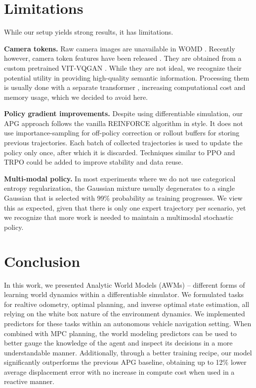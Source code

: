 \section{Limitations}

While our setup yields strong results, it has limitations. 

\textbf{Camera tokens.} Raw camera images are unavailable in WOMD \cite{ettinger2021large}. Recently however, camera token features have been released \cite{mu2024most}. They are obtained from a custom pretrained VIT-VQGAN \cite{yu2021vector}. While they are not ideal, we recognize their potential utility in providing high-quality semantic information. Processing them is usually done with a separate transformer \cite{dosovitskiy2020image, vaswani2017attention}, increasing computational cost and memory usage, which we decided to avoid here. 

\textbf{Policy gradient improvements.} Despite using differentiable simulation, our APG approach follows the vanilla REINFORCE algorithm in style. It does not use importance-sampling for off-policy correction or rollout buffers for storing previous trajectories. Each batch of collected trajectories is used to update the policy only once, after which it is discarded. Techniques similar to PPO \cite{schulman2017proximal} and TRPO \cite{schulman2015trust} could be added to improve stability and data reuse.

\textbf{Multi-modal policy.} In most experiments where we do not use categorical entropy regularization, the Gaussian mixture usually degenerates to a single Gaussian that is selected with 99\% probability as training progresses. We view this as expected, given that there is only one expert trajectory per scenario, yet we recognize that more work is needed to maintain a multimodal stochastic policy.


\section{Conclusion}
\label{sec: conclusion}

In this work, we presented Analytic World Models (AWMs) -- different forms of learning world dynamics within a differentiable simulator. We formulated tasks for realtive odometry, optimal planning, and inverse optimal state estimation, all relying on the white box nature of the environment dynamics. We implemented predictors for these tasks within an autonomous vehicle navigation setting. When combined with MPC planning, the world modeling predictors can be used to better gauge the knowledge of the agent and inspect its decisions in a more understandable manner. Additionally, through a better training recipe, our model significantly outperforms the previous APG baseline, obtaining up to 12\% lower average displacement error with no increase in compute cost when used in a reactive manner.